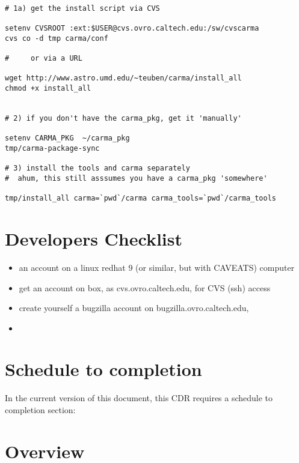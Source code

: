 \documentclass{article}
\begin{document}
\begin{verbatim}

# 1a) get the install script via CVS 

setenv CVSROOT :ext:$USER@cvs.ovro.caltech.edu:/sw/cvscarma
cvs co -d tmp carma/conf

#     or via a URL

wget http://www.astro.umd.edu/~teuben/carma/install_all
chmod +x install_all


# 2) if you don't have the carma_pkg, get it 'manually'

setenv CARMA_PKG  ~/carma_pkg
tmp/carma-package-sync

# 3) install the tools and carma separately
#  ahum, this still asssumes you have a carma_pkg 'somewhere'

tmp/install_all carma=`pwd`/carma carma_tools=`pwd`/carma_tools

\end{verbatim}   %

\bigskip

\section*{Developers Checklist}

\begin{itemize}

\item
an account on a linux redhat 9 (or similar, but with CAVEATS) computer

\item
get an account on box, as cvs.ovro.caltech.edu, for CVS (ssh) access

\item
create yourself a bugzilla account on  bugzilla.ovro.caltech.edu, 

\item

\end{itemize}

\newpage


\section*{Schedule to completion}

In the current version of this document, this CDR requires a schedule to completion
section:

\section*{Overview}
\end{document}
